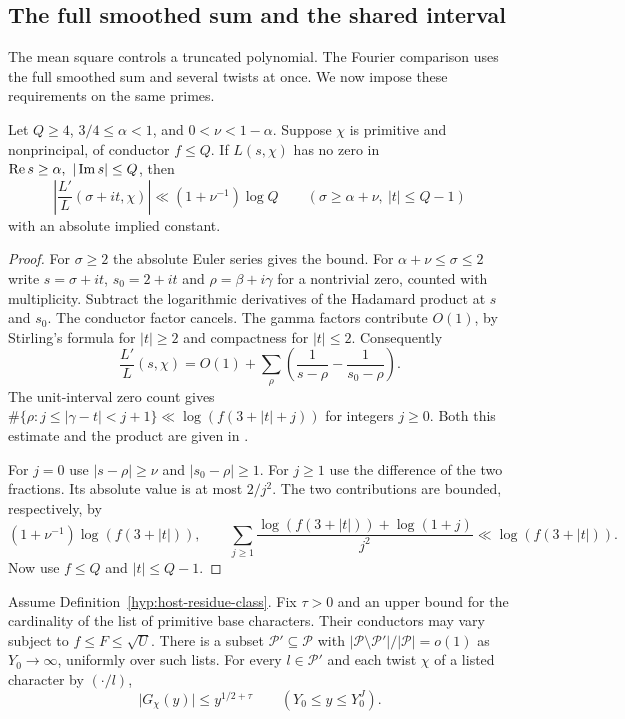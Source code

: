 \subsection{The full smoothed sum and the shared interval}

The mean square controls a truncated polynomial. The Fourier comparison uses the full
smoothed sum and several twists at once. We now impose these requirements on the same
primes.

\begin{auxlemma}\label{lem:host-log-derivative}
Let \(Q\ge4\), \(3/4\le\alpha<1\), and \(0<\nu<1-\alpha\).
Suppose \(\chi\) is primitive and nonprincipal, of conductor \(f\le Q\).
If \(L(s,\chi)\) has no zero in
\(\operatorname{Re} s\ge\alpha,\ |\operatorname{Im} s|\le Q\), then
\[
 \left|\frac{L'}{L}(\sigma+it,\chi)\right|
   \ll(1+\nu^{-1})\log Q
     \qquad(\sigma\ge\alpha+\nu,\ |t|\le Q-1)
\]
with an absolute implied constant.
\end{auxlemma}

\begin{proof}
For \(\sigma\ge2\) the absolute Euler series gives the bound.
For \(\alpha+\nu\le\sigma\le2\) write \(s=\sigma+it\),
\(s_0=2+it\) and \(\rho=\beta+i\gamma\) for a nontrivial zero,
counted with multiplicity. Subtract the logarithmic derivatives of
the Hadamard product at \(s\) and \(s_0\). The conductor factor cancels.
The gamma factors contribute \(O(1)\), by Stirling's formula for
\(|t|\ge2\) and compactness for \(|t|\le2\). Consequently
\[
 \frac{L'}{L}(s,\chi)=O(1)+\sum_\rho
        \left(\frac1{s-\rho}-\frac1{s_0-\rho}\right).
\]
The unit-interval zero count gives
\(\#\{\rho:j\le|\gamma-t|<j+1\}\ll\log(f(3+|t|+j))\)
for integers \(j\ge0\). Both this estimate and the product are
given in \cite[Lemma~10.3 and Section~10.2]{classical-region}.

For \(j=0\) use \(|s-\rho|\ge\nu\) and \(|s_0-\rho|\ge1\).
For \(j\ge1\) use the difference of the two fractions. Its
absolute value is at most \(2/j^2\). The two contributions are
bounded, respectively, by
\[
 (1+\nu^{-1})\log(f(3+|t|)),\qquad
 \sum_{j\ge1}\frac{\log(f(3+|t|))+\log(1+j)}{j^2}
    \ll\log(f(3+|t|)).
\]
Now use \(f\le Q\) and \(|t|\le Q-1\).
\end{proof}

\begin{proposition}\label{prop:quadratic-host-smoothed}
Assume Definition~\ref{hyp:host-residue-class}. Fix \(\tau>0\)
and an upper bound for the cardinality of the list of primitive base
characters. Their conductors may vary subject to \(f\le F\le\sqrt U\).
There is a subset \(\mathcal P'\subseteq\mathcal P\) with
\(|\mathcal P\setminus\mathcal P'|/|\mathcal P|=o(1)\) as
\(Y_0\to\infty\), uniformly over such lists. For every \(l\in\mathcal P'\)
and each twist \(\chi\) of a listed character by \((\cdot/l)\),
\[
 \lvert G_\chi(y)\rvert\le y^{1/2+\tau}\qquad(Y_0\le y\le Y_0^J).
\]

\end{proposition}

